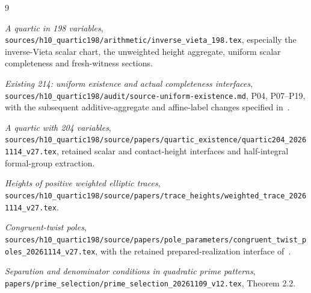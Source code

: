 \documentclass[11pt,a4paper]{article}
\begin{document}
\begin{thebibliography}{9}\raggedright
{}
\emph{A quartic in 198 variables},
\nolinkurl{sources/h10_quartic198/arithmetic/inverse_vieta_198.tex},
especially the inverse-Vieta scalar chart, the unweighted height
aggregate, uniform scalar completeness and fresh-witness sections.

\emph{Existing 214: uniform existence and actual completeness interfaces},
\nolinkurl{sources/h10_quartic198/audit/source-uniform-existence.md},
P04, P07--P19, with the subsequent additive-aggregate and affine-label
changes specified in~\cite{InverseVieta,Quartic204}.

\emph{A quartic with 204 variables},
\nolinkurl{sources/h10_quartic198/source/papers/quartic_existence/quartic204_20261114_v27.tex},
retained scalar and contact-height interfaces and half-integral
formal-group extraction.

\emph{Heights of positive weighted elliptic traces},
\nolinkurl{sources/h10_quartic198/source/papers/trace_heights/weighted_trace_20261114_v27.tex}.

\emph{Congruent-twist poles},
\nolinkurl{sources/h10_quartic198/source/papers/pole_parameters/congruent_twist_poles_20261114_v27.tex},
with the retained prepared-realization interface of~\cite{Uniform}.

\emph{Separation and denominator conditions in quadratic prime patterns},
\nolinkurl{papers/prime_selection/prime_selection_20261109_v12.tex},
Theorem 2.2.
\end{thebibliography}
\end{document}
